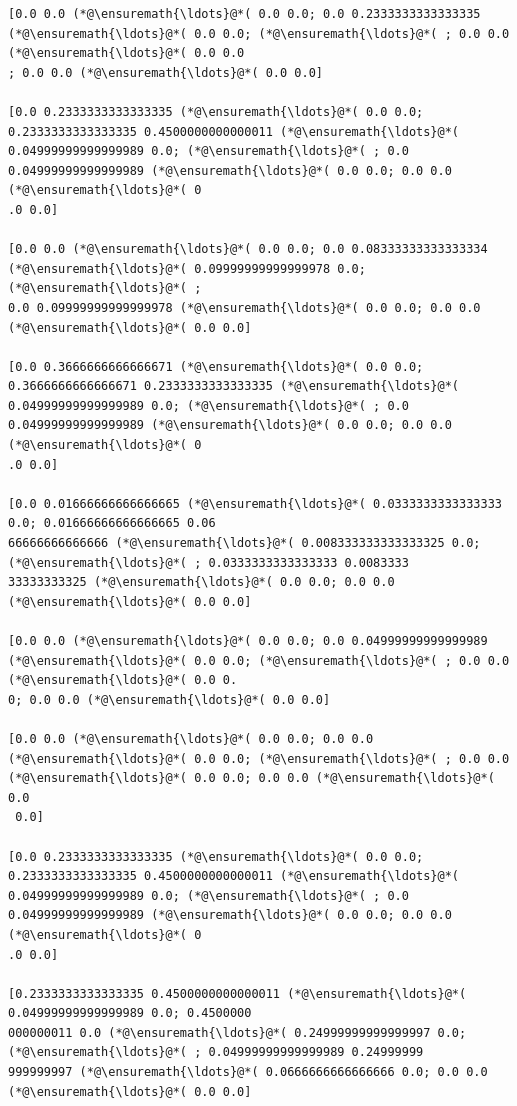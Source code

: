 \documentclass[12pt,a4paper]{article}
\begin{document}
\begin{lstlisting}
[0.0 0.0 (*@\ensuremath{\ldots}@*( 0.0 0.0; 0.0 0.2333333333333335 (*@\ensuremath{\ldots}@*( 0.0 0.0; (*@\ensuremath{\ldots}@*( ; 0.0 0.0 (*@\ensuremath{\ldots}@*( 0.0 0.0
; 0.0 0.0 (*@\ensuremath{\ldots}@*( 0.0 0.0]

[0.0 0.2333333333333335 (*@\ensuremath{\ldots}@*( 0.0 0.0; 0.2333333333333335 0.4500000000000011 (*@\ensuremath{\ldots}@*( 
0.04999999999999989 0.0; (*@\ensuremath{\ldots}@*( ; 0.0 0.04999999999999989 (*@\ensuremath{\ldots}@*( 0.0 0.0; 0.0 0.0 (*@\ensuremath{\ldots}@*( 0
.0 0.0]

[0.0 0.0 (*@\ensuremath{\ldots}@*( 0.0 0.0; 0.0 0.08333333333333334 (*@\ensuremath{\ldots}@*( 0.09999999999999978 0.0; (*@\ensuremath{\ldots}@*( ; 
0.0 0.09999999999999978 (*@\ensuremath{\ldots}@*( 0.0 0.0; 0.0 0.0 (*@\ensuremath{\ldots}@*( 0.0 0.0]

[0.0 0.3666666666666671 (*@\ensuremath{\ldots}@*( 0.0 0.0; 0.3666666666666671 0.2333333333333335 (*@\ensuremath{\ldots}@*( 
0.04999999999999989 0.0; (*@\ensuremath{\ldots}@*( ; 0.0 0.04999999999999989 (*@\ensuremath{\ldots}@*( 0.0 0.0; 0.0 0.0 (*@\ensuremath{\ldots}@*( 0
.0 0.0]

[0.0 0.01666666666666665 (*@\ensuremath{\ldots}@*( 0.0333333333333333 0.0; 0.01666666666666665 0.06
66666666666666 (*@\ensuremath{\ldots}@*( 0.008333333333333325 0.0; (*@\ensuremath{\ldots}@*( ; 0.0333333333333333 0.0083333
33333333325 (*@\ensuremath{\ldots}@*( 0.0 0.0; 0.0 0.0 (*@\ensuremath{\ldots}@*( 0.0 0.0]

[0.0 0.0 (*@\ensuremath{\ldots}@*( 0.0 0.0; 0.0 0.04999999999999989 (*@\ensuremath{\ldots}@*( 0.0 0.0; (*@\ensuremath{\ldots}@*( ; 0.0 0.0 (*@\ensuremath{\ldots}@*( 0.0 0.
0; 0.0 0.0 (*@\ensuremath{\ldots}@*( 0.0 0.0]

[0.0 0.0 (*@\ensuremath{\ldots}@*( 0.0 0.0; 0.0 0.0 (*@\ensuremath{\ldots}@*( 0.0 0.0; (*@\ensuremath{\ldots}@*( ; 0.0 0.0 (*@\ensuremath{\ldots}@*( 0.0 0.0; 0.0 0.0 (*@\ensuremath{\ldots}@*( 0.0
 0.0]

[0.0 0.2333333333333335 (*@\ensuremath{\ldots}@*( 0.0 0.0; 0.2333333333333335 0.4500000000000011 (*@\ensuremath{\ldots}@*( 
0.04999999999999989 0.0; (*@\ensuremath{\ldots}@*( ; 0.0 0.04999999999999989 (*@\ensuremath{\ldots}@*( 0.0 0.0; 0.0 0.0 (*@\ensuremath{\ldots}@*( 0
.0 0.0]

[0.2333333333333335 0.4500000000000011 (*@\ensuremath{\ldots}@*( 0.04999999999999989 0.0; 0.4500000
000000011 0.0 (*@\ensuremath{\ldots}@*( 0.24999999999999997 0.0; (*@\ensuremath{\ldots}@*( ; 0.04999999999999989 0.24999999
999999997 (*@\ensuremath{\ldots}@*( 0.0666666666666666 0.0; 0.0 0.0 (*@\ensuremath{\ldots}@*( 0.0 0.0]


\end{lstlisting}
\end{document}
